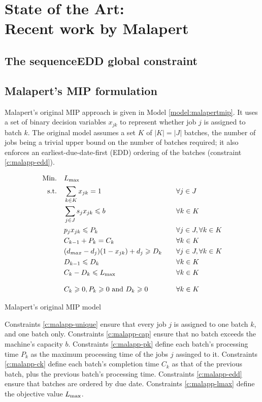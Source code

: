 \documentclass[13pt, letterpaper, oneside]{book}
\begin{document}
\chapter[State of the Art: Recent work by Malapert]{State of the Art:\\ Recent work by Malapert}
\section{The sequenceEDD global constraint}

\section{Malapert's MIP formulation}
Malapert's original MIP approach is given in Model \ref{model:malapertmip}. It
uses a set of binary decision variables $x_{jk}$ to represent whether job $j$ is
assigned to batch $k$. The original model assumes a set $K$ of $|K| = |J|$
batches, the number of jobs being a trivial upper bound on the number of batches
required; it also enforces an earliest-due-date-first (EDD) ordering of the
batches (constraint \eqref{c:malapp-edd}).

\begin{model}[h]
\begin{alignat}{2}
\mathrm{Min.}\quad & L_{\text{max}} && \\
\mathrm{s.t.}\quad &\sum_{k \in K} x_{jk} = 1 \quad && \forall j \in J
\label{c:malapp-unique}\\
  &\sum_{j \in J} s_j x_{jk} \leqslant b \quad && \forall k \in K\label{c:malapp-cap}\\
  &p_j x_{jk} \leqslant P_k \quad && \forall j \in J, \forall k \in
  K\label{c:malapp-pk}\\
  &C_{k-1} + P_{k} = C_k \quad && \forall k \in K\label{c:malapp-ck}\\
  &(d_{max} - d_j)(1 - x_{jk}) + d_j \geqslant D_k \quad && \forall j \in J, \forall
  k \in K\label{c:malapp-dk}\\
  &D_{k-1} \leqslant D_k \quad && \forall k \in K \label{c:malapp-edd} \\
  &C_k - D_k \leqslant L_{\text{max}} \quad && \forall k \in K\label{c:malapp-lmax}\\[2ex]
  &C_k \geqslant 0, P_k \geqslant 0 \text{ and } D_k \geqslant 0 \quad && \forall k \in K  
\end{alignat}
\caption{Malapert's original MIP model}
\label{model:malapertmip}
\end{model}

Constraints \eqref{c:malapp-unique} ensure that every job $j$ is assigned to
one batch $k$, and one batch only. Constraints \eqref{c:malapp-cap} ensure that
no batch exceeds the machine's capacity $b$. Constraints \eqref{c:malapp-pk}
define each batch's processing time $P_k$ as the maximum processing time of the
jobs $j$ assinged to it. Constraints \eqref{c:malapp-ck} define each batch's
completion time $C_k$ as that of the previous batch, plus the previous batch's
processing time. Constraints \eqref{c:malapp-edd} ensure that batches are
ordered by due date. Constraints \eqref{c:malapp-lmax} define the objective
value $L_{\text{max}}$.
\end{document}
